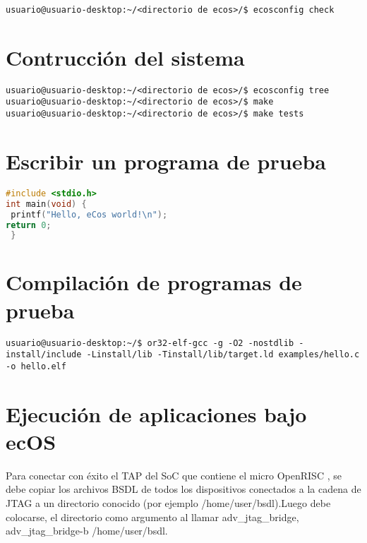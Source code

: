 \begin{lstlisting}[breaklines]
usuario@usuario-desktop:~/<directorio de ecos>/$ ecosconfig check
\end{lstlisting}


\section{Contrucción del sistema }


\begin{lstlisting}[breaklines]
usuario@usuario-desktop:~/<directorio de ecos>/$ ecosconfig tree
usuario@usuario-desktop:~/<directorio de ecos>/$ make
usuario@usuario-desktop:~/<directorio de ecos>/$ make tests
\end{lstlisting}

\section{Escribir un programa de prueba}

\begin{lstlisting}[language=C,frame=single]
#include <stdio.h>
int main(void) {
 printf("Hello, eCos world!\n");
return 0;
 }
\end{lstlisting}

\section{Compilación de programas de prueba}

\begin{lstlisting}[breaklines]
 usuario@usuario-desktop:~/$ or32-elf-gcc -g -O2 -nostdlib -install/include -Linstall/lib -Tinstall/lib/target.ld examples/hello.c -o hello.elf  
\end{lstlisting}



\section{Ejecución de aplicaciones bajo ecOS}

Para conectar con éxito el TAP del SoC que contiene el micro OpenRISC , se debe copiar los archivos BSDL de todos los dispositivos conectados a la cadena de JTAG a un directorio conocido (por ejemplo /home/user/bsdl).Luego debe colocarse, el directorio como argumento al llamar adv\_jtag\_bridge, adv\_jtag\_bridge-b /home/user/bsdl.

